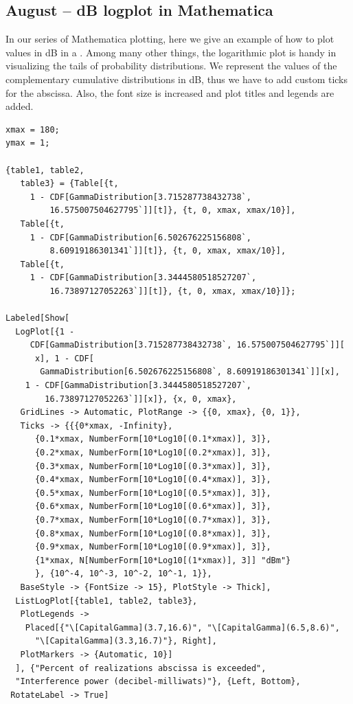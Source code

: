 \documentclass{article}
\begin{document}
\subsection{August – dB logplot in Mathematica}
In our series of Mathematica plotting, here we give an example of how to plot values in dB in a . Among many other things, the logarithmic plot is handy in visualizing the tails of probability distributions.  We represent the values of the complementary cumulative distributions in dB, thus we have to add custom ticks for the abscissa. Also, the font size is increased and plot titles and legends are added.
\begin{verbatim}
xmax = 180;
ymax = 1;

{table1, table2, 
   table3} = {Table[{t, 
     1 - CDF[GammaDistribution[3.715287738432738`, 
         16.575007504627795`]][t]}, {t, 0, xmax, xmax/10}], 
   Table[{t, 
     1 - CDF[GammaDistribution[6.502676225156808`, 
         8.60919186301341`]][t]}, {t, 0, xmax, xmax/10}], 
   Table[{t, 
     1 - CDF[GammaDistribution[3.3444580518527207`, 
         16.73897127052263`]][t]}, {t, 0, xmax, xmax/10}]};

Labeled[Show[
  LogPlot[{1 - 
     CDF[GammaDistribution[3.715287738432738`, 16.575007504627795`]][
      x], 1 - CDF[
       GammaDistribution[6.502676225156808`, 8.60919186301341`]][x], 
    1 - CDF[GammaDistribution[3.3444580518527207`, 
        16.73897127052263`]][x]}, {x, 0, xmax}, 
   GridLines -> Automatic, PlotRange -> {{0, xmax}, {0, 1}}, 
   Ticks -> {{{0*xmax, -Infinity},
      {0.1*xmax, NumberForm[10*Log10[(0.1*xmax)], 3]},
      {0.2*xmax, NumberForm[10*Log10[(0.2*xmax)], 3]},
      {0.3*xmax, NumberForm[10*Log10[(0.3*xmax)], 3]},
      {0.4*xmax, NumberForm[10*Log10[(0.4*xmax)], 3]},
      {0.5*xmax, NumberForm[10*Log10[(0.5*xmax)], 3]},
      {0.6*xmax, NumberForm[10*Log10[(0.6*xmax)], 3]},
      {0.7*xmax, NumberForm[10*Log10[(0.7*xmax)], 3]},
      {0.8*xmax, NumberForm[10*Log10[(0.8*xmax)], 3]},
      {0.9*xmax, NumberForm[10*Log10[(0.9*xmax)], 3]},
      {1*xmax, N[NumberForm[10*Log10[(1*xmax)], 3]] "dBm"}
      }, {10^-4, 10^-3, 10^-2, 10^-1, 1}}, 
   BaseStyle -> {FontSize -> 15}, PlotStyle -> Thick], 
  ListLogPlot[{table1, table2, table3}, 
   PlotLegends -> 
    Placed[{"\[CapitalGamma](3.7,16.6)", "\[CapitalGamma](6.5,8.6)", 
      "\[CapitalGamma](3.3,16.7)"}, Right], 
   PlotMarkers -> {Automatic, 10}]
  ], {"Percent of realizations abscissa is exceeded", 
  "Interference power (decibel-milliwats)"}, {Left, Bottom}, 
 RotateLabel -> True]


\end{verbatim}
\end{document}

